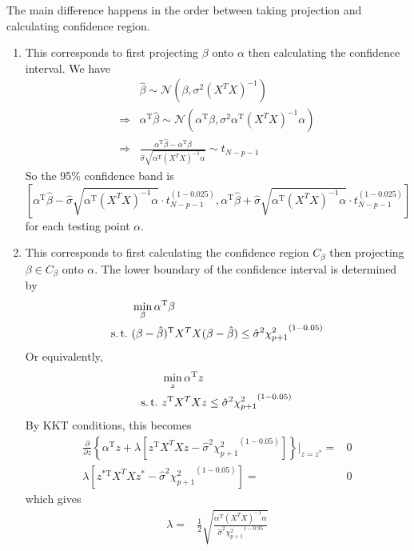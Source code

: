 \begin{sol}
The main difference happens in the order between taking projection and calculating confidence region.
\begin{enumerate}
\item This corresponds to first projecting $\beta$ onto $\alpha$ then calculating the confidence interval. We have
\begin{align*}
&\hat{\beta}\sim\mathcal{N}(\beta, \sigma^2(X^TX)^{-1})\\
\Longrightarrow & \alpha^\mathrm{T}\hat{\beta}\sim\mathcal{N}(\alpha^\mathrm{T}\beta, \sigma^2\alpha^\mathrm{T}(X^TX)^{-1}\alpha)\\
\Longrightarrow & \frac{\alpha^\mathrm{T}\hat{\beta} - \alpha^\mathrm{T}\beta}{\hat{\sigma}\sqrt{\alpha^\mathrm{T}(X^TX)^{-1}\alpha}} \sim t_{N-p-1}
\end{align*}
So the 95\% confidence band is
\[
\left[\alpha^\mathrm{T}\hat{\beta}-\hat{\sigma}\sqrt{\alpha^\mathrm{T}(X^TX)^{-1}\alpha}\cdot t_{N-p-1}^{(1-0.025)}, \alpha^\mathrm{T}\hat{\beta}+\hat{\sigma}\sqrt{\alpha^\mathrm{T}(X^TX)^{-1}\alpha}\cdot t_{N-p-1}^{(1-0.025)}\right]
\]
for each testing point $\alpha$.
\item This corresponds to first calculating the confidence region $C_\beta$ then projecting $\beta\in C_\beta$ onto $\alpha$. The lower boundary of the confidence interval is determined by
\begin{align*}
&\min_\beta \alpha^\mathrm{T}\beta\\
\st& (\beta-\hat{\beta})^\mathrm{T}X^TX(\beta-\hat{\beta})\le\hat{\sigma}^2{\chi_{p+1}^2}^{(1-0.05)}
\end{align*}
Or equivalently,
\begin{align*}
&\min_z \alpha^\mathrm{T}z\\
\st& z^\mathrm{T}X^TXz\le\hat{\sigma}^2{\chi_{p+1}^2}^{(1-0.05)}
\end{align*}
By KKT conditions, this becomes
\begin{align*}
\frac{\partial}{\partial z}\left\{\alpha^{\mathrm{T}}z + \lambda\left[z^\mathrm{T}X^TXz-\hat{\sigma}^2{\chi_{p+1}^2}^{(1-0.05)}\right]\right\}\bigg|_{z=z^*}=& 0\\
\lambda\left[z^{*\mathrm{T}}X^TXz^*-\hat{\sigma}^2{\chi_{p+1}^2}^{(1-0.05)}\right] =& 0
\end{align*}
which gives
\begin{align*}
\lambda=&\frac{1}{2}\sqrt{\frac{\alpha^\mathrm{T}(X^TX)^{-1}\alpha}{\hat{\sigma}^2{\chi_{p+1}^2}^{1-0.95}}}\\

\end{align*}
\end{enumerate}
\end{sol}
